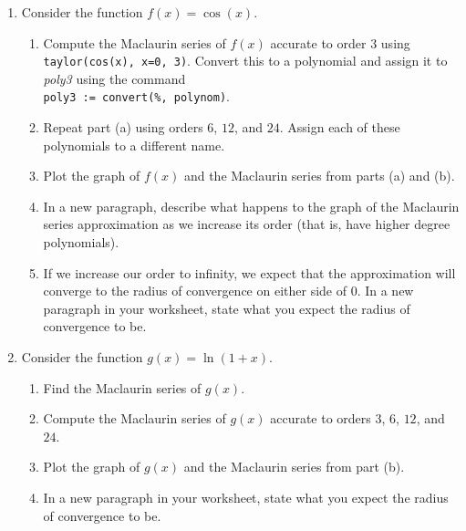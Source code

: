 \begin{enumerate}
\item Consider the function $f(x) = \cos(x)$.
	\begin{enumerate}
	\item Compute the Maclaurin series of $f(x)$ accurate to order $3$ using \\
	\texttt{taylor(cos(x), x=0, 3)}. Convert this to a polynomial and assign it to \textit{poly3} using the command \\
	\texttt{poly3 := convert(\%, polynom)}.
	\item Repeat part (a) using orders $6$, $12$, and $24$. Assign each of these polynomials to a different name.
    \item Plot the graph of $f(x)$ and the Maclaurin series from parts (a) and (b).
    \item In a new paragraph, describe what happens to the graph of the Maclaurin series approximation as we increase its order (that is, have higher degree polynomials).
    \item If we increase our order to infinity, we expect that the approximation will converge to the radius of convergence on either side of $0$. In a new paragraph in your worksheet, state what you expect the radius of convergence to be.
	\end{enumerate}
	\clearpage
\item Consider the function $g(x) = \ln(1+x)$.
	\begin{enumerate}
	\item Find the Maclaurin series of $g(x)$.
    \item Compute the Maclaurin series of $g(x)$ accurate to orders $3$, $6$, $12$, and $24$. 
    \item Plot the graph of $g(x)$ and the Maclaurin series from part (b).
    \item In a new paragraph in your worksheet, state what you expect the radius of convergence to be.
	\end{enumerate}
	

\end{enumerate}
